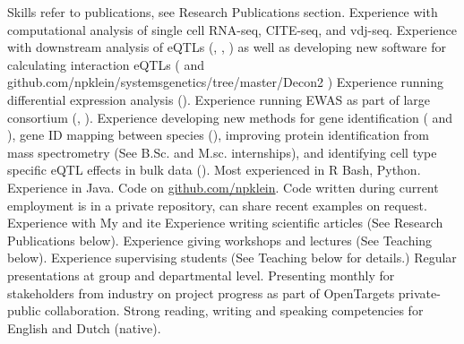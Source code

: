 

\begin{rubric}{Skills}
\entry*[]
\circled{} refer to publications, see Research Publications section. 
	Experience with computational analysis of single cell RNA-seq, CITE-seq, and vdj-seq.
\entry*[QTLs]
	Experience with downstream analysis of eQTLs (,  , ) as well as developing new software for calculating interaction eQTLs (  and github.com/npklein/systemsgenetics/tree/master/Decon2 )
	Experience running differential expression analysis ().
\entry*[(G/E)WAS]
	Experience running EWAS as part of large consortium (, ). 
	Experience developing new methods for gene identification ( and ), gene ID mapping between species (), improving protein identification from mass spectrometry (See B.Sc. and M.sc. internships), and identifying cell type specific eQTL effects in bulk data ().
\entry*[Coding]
Most experienced in R Bash, Python. Experience in Java. Code on \url{github.com/npklein}. Code written during current employment is in a private repository, can share recent examples on request. 
\entry*[Databases]
	Experience with My and ite
\entry*[Writing]
Experience writing scientific articles (See Research Publications below).
Experience giving workshops and lectures (See Teaching below). Experience supervising students (See Teaching below for details.)
Regular presentations at group and departmental level. Presenting monthly for stakeholders from industry on project progress as part of OpenTargets private-public collaboration.
\entry*[Languages]
Strong reading, writing and speaking competencies for English and Dutch (native).

\end{rubric}
